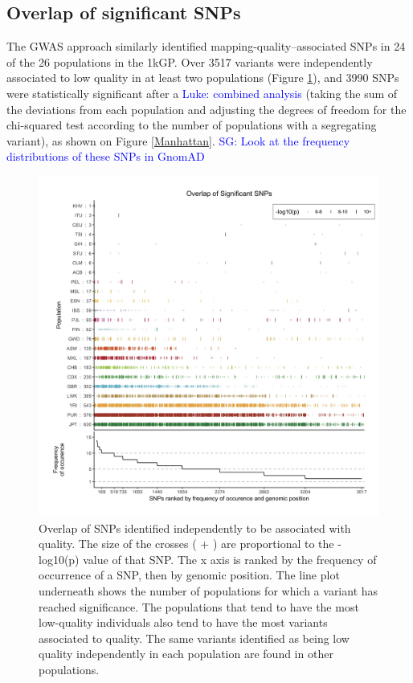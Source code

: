 \documentclass[9pt,lineno]{elife}
\newcommand{\sgcomment}[1]{\textcolor{blue}{SG: #1}}
\newcommand{\luke}[1]{\textcolor{blue}{Luke: #1}}
\begin{document}
\subsection{Overlap of significant SNPs}
The GWAS approach similarly identified mapping-quality--associated SNPs in 24 of the 26 populations in the 1kGP.
Over 3517 variants were independently associated to low quality in at least two populations  (Figure \ref{OverLap}), and 3990 SNPs were statistically significant after a \luke{combined analysis} (taking the sum of the deviations from each population and adjusting the degrees of freedom for the chi-squared test according to the number of populations with a segregating variant), as shown on Figure \ref{Manhattan}.  
\sgcomment{Look at the frequency distributions of these SNPs in GnomAD}

\begin{figure}
\includegraphics[width=\hsize,keepaspectratio]{./Figures/SNPOverlap6.jpg}

\caption{Overlap of SNPs identified independently to be associated with quality. 
The size of the crosses ( + ) are proportional to the -log10(p) value of that SNP.
The x axis is ranked by the frequency of occurrence of a SNP, then by genomic position.
The line plot underneath shows the number of populations for which a variant has reached significance.
The populations that tend to have the most low-quality individuals also tend to have the most variants associated to quality. 
The same variants identified as being low quality independently in each population are found in other populations. }
  \label{OverLap}
\end{figure}
\end{document}
